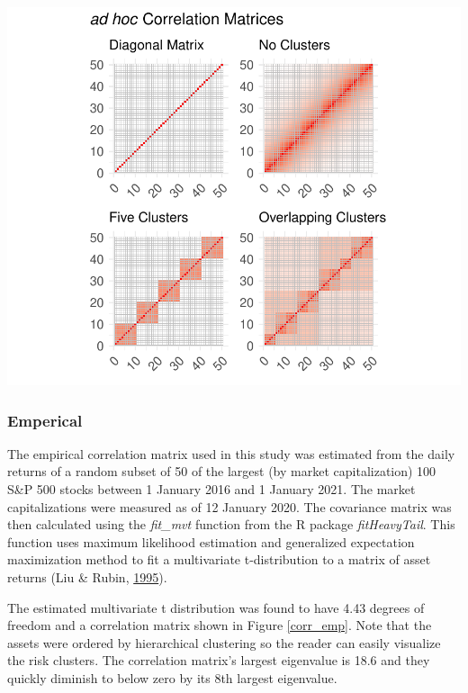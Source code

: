 \documentclass[11pt,preprint, authoryear]{elsarticle}
\let\origfigure\figure
\let\endorigfigure\endfigure
\renewenvironment{figure}[1][2] {
    \expandafter\origfigure\expandafter[H]
} {
    \endorigfigure
}
\numberwithin{equation}{section}
\numberwithin{figure}{section}
\numberwithin{table}{section}
\begin{document}
\begin{figure}
\centering
\includegraphics{Thesis_files/figure-latex/corr mats-1.pdf}
\caption{\label{corr_mats} Correlation Matricies}
\end{figure}

\hypertarget{emperical}{%
\subsubsection{\texorpdfstring{Emperical
\label{emp}}{Emperical }}\label{emperical}}

The empirical correlation matrix used in this study was estimated from
the daily returns of a random subset of 50 of the largest (by market
capitalization) 100 S\&P 500 stocks between 1 January 2016 and 1 January
2021. The market capitalizations were measured as of 12 January 2020.
The covariance matrix was then calculated using the \emph{fit\_mvt}
function from the R package \emph{fitHeavyTail}. This function uses
maximum likelihood estimation and generalized expectation maximization
method to fit a multivariate t-distribution to a matrix of asset returns
(Liu \& Rubin, \protect\hyperlink{ref-liu1995}{1995}).

The estimated multivariate t distribution was found to have 4.43 degrees
of freedom and a correlation matrix shown in Figure \ref{corr_emp}. Note
that the assets were ordered by hierarchical clustering so the reader
can easily visualize the risk clusters. The correlation matrix's largest
eigenvalue is 18.6 and they quickly diminish to below zero by its 8th
largest eigenvalue.
\end{document}
